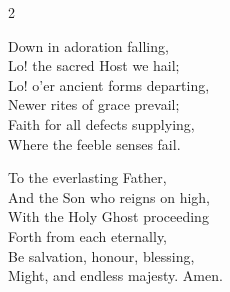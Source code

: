 \begin{multicols}{2}
\raggedcolumns
\begin{enpars}
Down in adoration falling,\\
Lo! the sacred Host we hail;\\
Lo! o'er ancient forms departing,\\
Newer rites of grace prevail;\\
Faith for all defects supplying,\\
Where the feeble senses fail.

To the everlasting Father,\\
And the Son who reigns on high,\\
With the Holy Ghost proceeding\\
Forth from each eternally,\\
Be salvation, honour, blessing,\\
Might, and endless majesty.
Amen.
\end{enpars}
\end{multicols}

%
%
%
